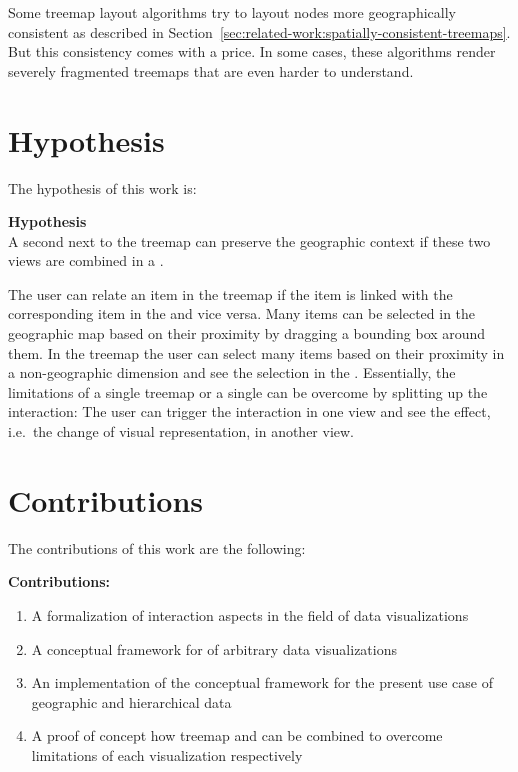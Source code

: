 Some treemap layout algorithms try to layout nodes more geographically consistent as described in Section~\ref{sec:related-work:spatially-consistent-treemaps}.
But this consistency comes with a price.
In some cases, these algorithms render severely fragmented treemaps that are even harder to understand.


\section{Hypothesis}\label{sec:introduction:hypothesis}
The hypothesis of this work is:
\begin{tcolorbox}
\textbf{Hypothesis} \\
A second \gv{} next to the treemap can preserve the geographic context if these two views are combined in a \cmv{}.
\end{tcolorbox}

The user can relate an item in the treemap if the item is linked with the corresponding item in the \gv{} and vice versa.
Many items can be selected in the geographic map based on their proximity by dragging a bounding box around them.
In the treemap the user can select many items based on their proximity in a non-geographic dimension and see the selection in the \gv{}.
Essentially,  the limitations of a single treemap or a single \gv{} can be overcome by splitting up the interaction:
The user can trigger the interaction in one view and see the effect, i.e.\ the change of visual representation, in another view.


\section{Contributions}


\begin{minipage}{\textwidth}
	The contributions of this work are the following: \\
	\begin{tcolorbox}
		\textbf{Contributions:}
		\begin{enumerate}
  \item A formalization of interaction aspects in the field of data visualizations
  \item A conceptual framework for \cmvs{} of arbitrary data visualizations
  \item An implementation of the conceptual framework for the present use case of geographic and hierarchical data
  \item A proof of concept how treemap and \gv{} can be combined to overcome limitations of each visualization respectively
		\end{enumerate}
	\end{tcolorbox}
\end{minipage} \\




